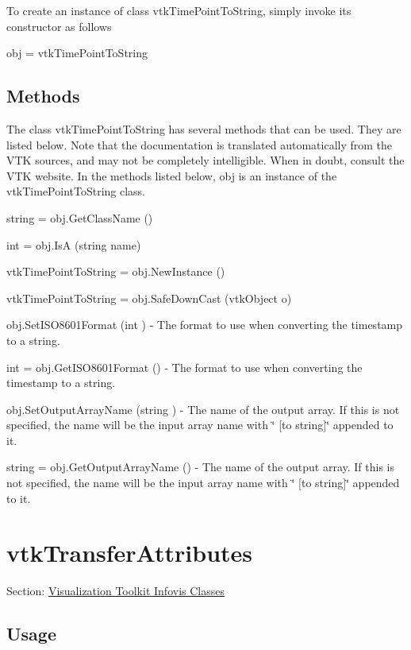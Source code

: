 To create an instance of class vtk\-Time\-Point\-To\-String, simply invoke its constructor as follows \begin{DoxyVerb}  obj = vtkTimePointToString
\end{DoxyVerb}
 \hypertarget{vtkwidgets_vtkxyplotwidget_Methods}{}\subsection{Methods}\label{vtkwidgets_vtkxyplotwidget_Methods}
The class vtk\-Time\-Point\-To\-String has several methods that can be used. They are listed below. Note that the documentation is translated automatically from the V\-T\-K sources, and may not be completely intelligible. When in doubt, consult the V\-T\-K website. In the methods listed below, {\ttfamily obj} is an instance of the vtk\-Time\-Point\-To\-String class. 
\begin{DoxyItemize}
\item {\ttfamily string = obj.\-Get\-Class\-Name ()}  
\item {\ttfamily int = obj.\-Is\-A (string name)}  
\item {\ttfamily vtk\-Time\-Point\-To\-String = obj.\-New\-Instance ()}  
\item {\ttfamily vtk\-Time\-Point\-To\-String = obj.\-Safe\-Down\-Cast (vtk\-Object o)}  
\item {\ttfamily obj.\-Set\-I\-S\-O8601\-Format (int )} -\/ The format to use when converting the timestamp to a string.  
\item {\ttfamily int = obj.\-Get\-I\-S\-O8601\-Format ()} -\/ The format to use when converting the timestamp to a string.  
\item {\ttfamily obj.\-Set\-Output\-Array\-Name (string )} -\/ The name of the output array. If this is not specified, the name will be the input array name with \char`\"{} \mbox{[}to string\mbox{]}\char`\"{} appended to it.  
\item {\ttfamily string = obj.\-Get\-Output\-Array\-Name ()} -\/ The name of the output array. If this is not specified, the name will be the input array name with \char`\"{} \mbox{[}to string\mbox{]}\char`\"{} appended to it.  
\end{DoxyItemize}\hypertarget{vtkinfovis_vtktransferattributes}{}\section{vtk\-Transfer\-Attributes}\label{vtkinfovis_vtktransferattributes}
Section\-: \hyperlink{sec_vtkinfovis}{Visualization Toolkit Infovis Classes} \hypertarget{vtkwidgets_vtkxyplotwidget_Usage}{}\subsection{Usage}\label{vtkwidgets_vtkxyplotwidget_Usage}
